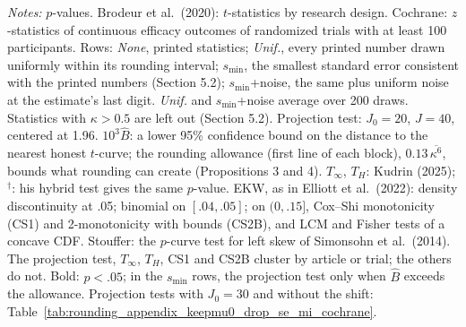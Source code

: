 \begin{table}[htbp]
\medskip
\begin{minipage}{\linewidth}
\footnotesize
\textit{Notes:} $p$-values. Brodeur et al.\ (2020): $t$-statistics by research design. Cochrane: $z$-statistics of continuous efficacy outcomes of randomized trials with at least 100 participants.
Rows: \textit{None}, printed statistics; \textit{Unif.}, every printed number drawn uniformly within its rounding interval; $s_{\min}$, the smallest standard error consistent with the printed numbers (Section 5.2); $s_{\min}$+noise, the same plus uniform noise at the estimate's last digit. \textit{Unif.} and $s_{\min}$+noise average over 200 draws.
Statistics with $\kappa>0.5$ are left out (Section 5.2).
Projection test: $J_0=20$, $J=40$, centered at 1.96. $10^3\widehat{B}$: a lower 95\% confidence bound on the distance to the nearest honest $t$-curve; the rounding allowance (first line of each block), $0.13\,\overline{\kappa^6}$, bounds what rounding can create (Propositions 3 and 4).
$T_\infty$, $T_H$: Kudrin (2025); $^\dagger$: his hybrid test gives the same $p$-value.
EKW, as in Elliott et al.\ (2022): density discontinuity at .05; binomial on $[.04,.05]$; on $(0,.15]$, Cox--Shi monotonicity (CS1) and 2-monotonicity with bounds (CS2B), and LCM and Fisher tests of a concave CDF.
Stouffer: the $p$-curve test for left skew of Simonsohn et al.\ (2014).
The projection test, $T_\infty$, $T_H$, CS1 and CS2B cluster by article or trial; the others do not.
Bold: $p<.05$; in the $s_{\min}$ rows, the projection test only when $\widehat{B}$ exceeds the allowance.
Projection tests with $J_0=30$ and without the shift: Table~\ref{tab:rounding_appendix_keepmu0_drop_se_mi_cochrane}.
\end{minipage}
\end{table}
